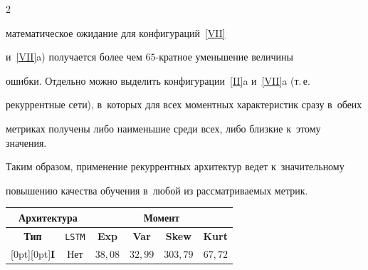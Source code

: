 \begin{multicols}{2}



\noindent

 математическое ожидание для конфигураций~\ref{VII} 

и~\ref{VII}{a}) получается более чем $65$-крат\-ное уменьшение величины 

ошибки. Отдельно можно выделить конфигурации~\ref{II}{a} и~\ref{VII}{a} (т.\,е.\ 

рекуррентные сети), в~которых для всех моментных характеристик сразу в~обеих 

метриках получены либо наименьшие среди всех, либо близкие к~этому значения. 

Таким образом, применение рекуррентных архитектур ведет к~значительному 

повышению качества обучения в~любой из рассматриваемых метрик. 



\begin{table}[b]\small %

\vspace*{-8pt}

\begin{center}


\label{TabTime}

\vspace*{2ex}



\tabcolsep=10pt

\begin{tabular}{|c|c|r|r|r|r|}

\hline

\multicolumn{2}{|c|}{\bf Архитектура}&\multicolumn{4}{c|}{\bf Момент}\\

\hline

{\bf Тип}&\verb"LSTM"&\multicolumn{1}{c|}{{\bf Exp}}&

\multicolumn{1}{c|}{{\bf Var}}&

\multicolumn{1}{c|}{{\bf Skew}}&\multicolumn{1}{c|}{{\bf Kurt}}\\

\hline

\multicolumn{1}{|c|}{\raisebox{-6pt}[0pt][0pt]{{\bf I}}}&Нет&$38{,}08$&$32{,}99$&$303{,}79$&$67{,}72$\\



\end{tabular}
\end{center}
\end{table}
\end{multicols}
